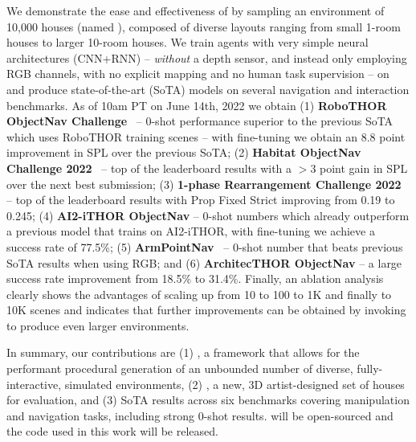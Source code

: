 We demonstrate the ease and effectiveness of \env by sampling an environment of 10,000 houses (named \tenk), composed of diverse layouts ranging from small 1-room houses to larger 10-room houses. We train agents with very simple neural architectures (CNN+RNN) -- \emph{without} a depth sensor, and instead only employing RGB channels, with no explicit mapping and no human task supervision -- on \tenk and produce state-of-the-art (SoTA) models on several navigation and interaction benchmarks. As of 10am PT on June 14th, 2022 we obtain (1) \textbf{RoboTHOR ObjectNav Challenge}~\cite{robothor-challenge} --  0-shot performance superior to the previous SoTA which uses RoboTHOR training scenes -- with fine-tuning we obtain an 8.8 point improvement in SPL over the previous SoTA; (2) \textbf{Habitat ObjectNav Challenge 2022}~\cite{habitat-challenge} -- top of the leaderboard results with a ${>}3$ point gain in SPL over the next best submission; (3) \textbf{1-phase Rearrangement Challenge 2022}~\cite{roomr-challenge} -- top of the leaderboard results with Prop Fixed Strict improving from 0.19 to 0.245; (4) \textbf{AI2-iTHOR ObjectNav} -- 0-shot numbers which already outperform a previous model that trains on AI2-iTHOR, with fine-tuning we achieve a success rate of 77.5\%; (5) \textbf{ArmPointNav}~\cite{manipulathor} -- 0-shot number that beats previous SoTA results when using RGB; and (6) \textbf{ArchitecTHOR ObjectNav} -- a large success rate improvement from 18.5\% to 31.4\%. Finally, an ablation analysis clearly shows the advantages of scaling up from 10 to 100 to 1K and finally to 10K scenes and indicates that further improvements can be obtained by invoking \env to produce even larger environments.

In summary, our contributions are (1) \env, a framework that allows for the performant procedural generation of an unbounded number of diverse, fully-interactive, simulated environments, (2) \elienv, a new, 3D artist-designed set of houses for \eai evaluation, and (3) SoTA results across six \eai benchmarks covering manipulation and navigation tasks, including strong 0-shot results.
\env will be open-sourced and the code used in this work will be released.  

